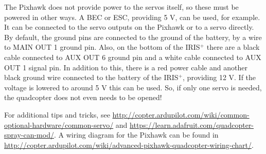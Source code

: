 \documentclass[titlepage,11pt,a4paper]{article}
\begin{document}
The Pixhawk does not provide power to the servos itself, so these must
be powered in other ways. A BEC or ESC, providing 5 V, can be used,
for example. It can be connected to the servo outputs on the Pixhawk
or to a servo directly. By default, the ground pins are connected to
the ground of the battery, by a wire to MAIN OUT 1 ground pin. Also,
on the bottom of the IRIS$^+$ there are a black cable connected to AUX
OUT 6 ground pin and a white cable connected to AUX OUT 1 signal
pin. In addition to this, there is a red power cable and another black
ground wire connected to the battery of the IRIS$^+$, providing 12
V. If the voltage is lowered to around 5 V this can be used. So, if
only one servo is needed, the quadcopter does not even needs to be
opened!

For additional tips and tricks, see
\url{http://copter.ardupilot.com/wiki/common-optional-hardware/common-servo/}
and \url{https://learn.adafruit.com/quadcopter-spray-can-mod/}. A
wiring diagram for the Pixhawk can be found in
\url{http://copter.ardupilot.com/wiki/advanced-pixhawk-quadcopter-wiring-chart/}.
\end{document}
